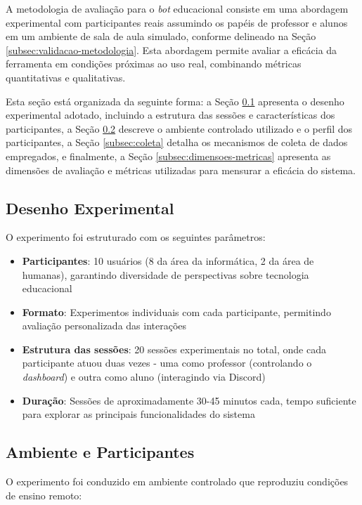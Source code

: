 A metodologia de avaliação para o \textit{bot} educacional consiste em uma
abordagem experimental com participantes reais assumindo os papéis de professor
e alunos em um ambiente de sala de aula simulado, conforme delineado na Seção
\ref{subsec:validacao-metodologia}. Esta abordagem permite avaliar a eficácia da
ferramenta em condições próximas ao uso real, combinando métricas quantitativas
e qualitativas.

Esta seção está organizada da seguinte forma: a Seção \ref{subsec:desenho}
apresenta o desenho experimental adotado, incluindo a estrutura das sessões e
características dos participantes, a Seção \ref{subsec:ambiente} descreve o
ambiente controlado utilizado e o perfil dos participantes, a Seção
\ref{subsec:coleta} detalha os mecanismos de coleta de dados empregados, e
finalmente, a Seção \ref{subsec:dimensoes-metricas} apresenta as dimensões de
avaliação e métricas utilizadas para mensurar a eficácia do sistema.

\subsection{Desenho Experimental}
\label{subsec:desenho}

O experimento foi estruturado com os seguintes parâmetros:

\begin{itemize}
\item \textbf{Participantes}: 10 usuários (8 da área da informática, 2 da área
de humanas), garantindo diversidade de perspectivas sobre tecnologia educacional
\item \textbf{Formato}: Experimentos individuais com cada participante,
permitindo avaliação personalizada das interações
\item \textbf{Estrutura das sessões}: 20 sessões experimentais no total, onde
cada participante atuou duas vezes - uma como professor (controlando o
\textit{dashboard}) e outra como aluno (interagindo via Discord)
\item \textbf{Duração}: Sessões de aproximadamente 30-45 minutos cada, tempo
suficiente para explorar as principais funcionalidades do sistema
\end{itemize}

\subsection{Ambiente e Participantes}
\label{subsec:ambiente}

O experimento foi conduzido em ambiente controlado que reproduziu condições de
ensino remoto:

